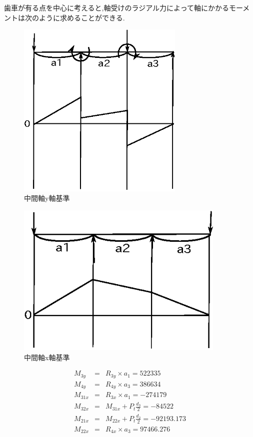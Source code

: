 歯車が有る点を中心に考えると,軸受けのラジアル力によって軸にかかるモーメントは次のように求めることができる.
\begin{figure}[htbp]
\begin{center}
\includegraphics[width=8cm]{../pictures/twoccwx.eps}
\end{center}
\caption{中間軸y軸基準}
\end{figure}
\begin{figure}[htbp]
\begin{center}
\includegraphics[width=10cm]{../pictures/twoccwy.eps}
\end{center}
\caption{中間軸x軸基準}
\end{figure}
\begin{eqnarray}
M_{3y}  &=& R_{3y} \times a_1          =522335\\
M_{4y}  &=& R_{4y} \times a_3          =386634\\
M_{31x} &=& R_{3x} \times a_1          =-274179\\
M_{32x} &=& M_{31x} + P_t \frac{d_3}{2} =-84522\\
M_{21x} &=& M_{22x} + P_t \frac{d_2}{2} =-92193.173\\
M_{22x} &=& R_{4x} \times a_3          =97466.276\\
\end{eqnarray}
